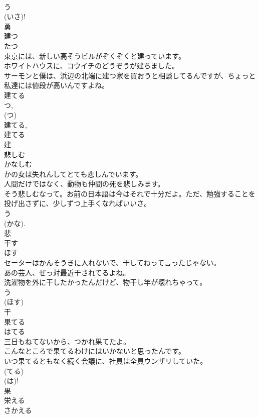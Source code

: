 \documentclass[8pt]{extreport}
\begin{document}
\begin{CJK}{UTF8}{min}
\\	う 
\\	(いさ)! 
\\	勇	
\\	建つ	
\\	たつ	
\\	東京には、新しい高そうビルがぞくぞくと建っています。	
\\	ホワイトハウスに、コウイチのどうぞうが建ちました。	
\\	サーモンと僕は、浜辺の北端に建つ家を買おうと相談してるんですが、ちょっと私達には値段が高いんですよね。	
\\	建てる 
\\	つ, 
\\	(つ) 
\\	建てる, 
\\	建てる 
\\	建	
\\	悲しむ	
\\	かなしむ	
\\	かの女は失れんしてとても悲しんでいます。	
\\	人間だけではなく、動物も仲間の死を悲しみます。	
\\	そう悲しむなって。お前の日本語は今はそれで十分だよ。ただ、勉強することを投げ出さずに、少しずつ上手くなればいいさ。	
\\	う 
\\	(かな). 
\\	悲	
\\	干す	
\\	ほす	
\\	セーターはかんそうきに入れないで、干してねって言ったじゃない。	
\\	あの芸人、ぜっ対最近干されてるよね。	
\\	洗濯物を外に干したかったんだけど、物干し竿が壊れちゃって。	
\\	う 
\\	(ほす) 
\\	干	
\\	果てる	
\\	はてる	
\\	三日もねてないから、つかれ果てたよ。	
\\	こんなところで果てるわけにはいかないと思ったんです。	
\\	いつ果てるともなく続く会議に、社員は全員ウンザリしていた。	
\\	(てる) 
\\	(は)!
\\	果	
\\	栄える	
\\	さかえる	

\end{CJK}
\end{document}
